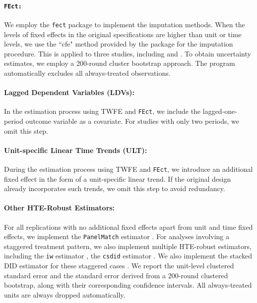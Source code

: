 \documentclass[12pt]{article}
\begin{document}
\paragraph*{\texttt{FEct:}} We employ the \texttt{fect} package to implement the imputation methods. When the levels of fixed effects in the original specifications are higher than unit or time levels, we use the ``cfe" method provided by the package for the imputation procedure.  This is applied to three studies, including \citet{Bischof2019, dewan2020victorian} and \citet{Schuit2017}. To obtain uncertainty estimates, we employ a 200-round cluster bootstrap approach. The program automatically excludes all always-treated observations.

\paragraph*{Lagged Dependent Variables (LDVs):} In the estimation process using TWFE and \texttt{FEct}, we include the lagged-one-period outcome variable as a covariate. For studies with only two periods, we omit this step.


\paragraph*{Unit-specific Linear Time Trends (ULT):} During the estimation process using TWFE and \texttt{FEct}, we introduce an additional fixed effect in the form of a unit-specific linear trend. If the original design already incorporates such trends, we omit this step to avoid redundancy.


\paragraph*{Other HTE-Robust Estimators:} For all replications with no additional fixed effects apart from unit and time fixed effects, we implement the \texttt{PanelMatch} estimator \citep{IKW2021}. For analyses involving a staggered treatment pattern, we also implement multiple HTE-robust estimators, including the \texttt{iw} estimator \citep{sun2021-event}, the \texttt{csdid} estimator \citep{callaway2021-did}. We also implement the stacked DID estimator for these staggered cases \citep{cengiz2019effect}. We report the unit-level clustered standard error and the standard error derived from a 200-round clustered bootstrap, along with their corresponding confidence intervals. All always-treated units are always dropped automatically.
\end{document}
